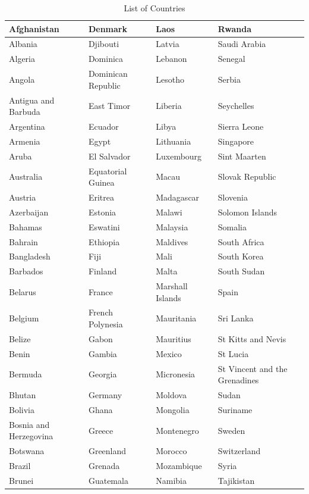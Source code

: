 \documentclass[12pt]{article}
\begin{document}
\begin{table}[htbp]
\centering
\caption{List of Countries}
\label{tab:countries}
\footnotesize
\begin{tabular}{|l|l|l|l|}
\hline
Afghanistan & Denmark & Laos & Rwanda \\
\hline
Albania & Djibouti & Latvia & Saudi Arabia \\
\hline
Algeria & Dominica & Lebanon & Senegal \\
\hline
Angola & Dominican Republic & Lesotho & Serbia \\
\hline
Antigua and Barbuda & East Timor & Liberia & Seychelles \\
\hline
Argentina & Ecuador & Libya & Sierra Leone \\
\hline
Armenia & Egypt & Lithuania & Singapore \\
\hline
Aruba & El Salvador & Luxembourg & Sint Maarten \\
\hline
Australia & Equatorial Guinea & Macau & Slovak Republic \\
\hline
Austria & Eritrea & Madagascar & Slovenia \\
\hline
Azerbaijan & Estonia & Malawi & Solomon Islands \\
\hline
Bahamas & Eswatini & Malaysia & Somalia \\
\hline
Bahrain & Ethiopia & Maldives & South Africa \\
\hline
Bangladesh & Fiji & Mali & South Korea \\
\hline
Barbados & Finland & Malta & South Sudan \\
\hline
Belarus & France & Marshall Islands & Spain \\
\hline
Belgium & French Polynesia & Mauritania & Sri Lanka \\
\hline
Belize & Gabon & Mauritius & St Kitts and Nevis \\
\hline
Benin & Gambia & Mexico & St Lucia \\
\hline
Bermuda & Georgia & Micronesia & St Vincent and the Grenadines \\
\hline
Bhutan & Germany & Moldova & Sudan \\
\hline
Bolivia & Ghana & Mongolia & Suriname \\
\hline
Bosnia and Herzegovina & Greece & Montenegro & Sweden \\
\hline
Botswana & Greenland & Morocco & Switzerland \\
\hline
Brazil & Grenada & Mozambique & Syria \\
\hline
Brunei & Guatemala & Namibia & Tajikistan \\

\end{tabular}
\end{table}
\end{document}
